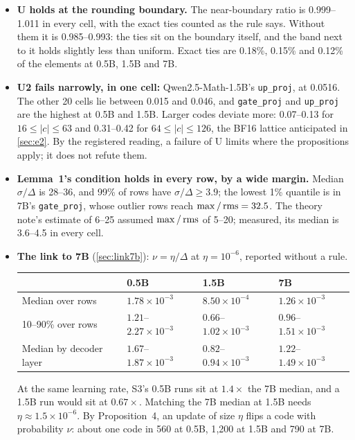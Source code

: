 \documentclass[11pt]{article}
\begin{document}
\begin{itemize}
\item \textbf{U holds at the rounding boundary.} The near-boundary ratio is 0.999--1.011 in every cell, with the exact ties counted as the rule says. Without them it is 0.985--0.993: the ties sit on the boundary itself, and the band next to it holds slightly less than uniform. Exact ties are 0.18\%, 0.15\% and 0.12\% of the elements at 0.5B, 1.5B and 7B.
\item \textbf{U2 fails narrowly, in one cell:} Qwen2.5-Math-1.5B's \texttt{up\_proj}, at 0.0516. The other 20 cells lie between 0.015 and 0.046, and \texttt{gate\_proj} and \texttt{up\_proj} are the highest at 0.5B and 1.5B. Larger codes deviate more: 0.07--0.13 for $16\le|c|\le63$ and 0.31--0.42 for $64\le|c|\le126$, the BF16 lattice anticipated in \cref{sec:e2}. By the registered reading, a failure of U limits where the propositions apply; it does not refute them.
\item \textbf{Lemma~1's condition holds in every row, by a wide margin.} Median $\sigma/\Delta$ is 28--36, and 99\% of rows have $\sigma/\Delta\ge3.9$; the lowest 1\% quantile is in 7B's \texttt{gate\_proj}, whose outlier rows reach $\max/\operatorname{rms}=32.5$. The theory note's estimate of 6--25 assumed $\max/\operatorname{rms}$ of 5--20; measured, its median is 3.6--4.5 in every cell.
\item \textbf{The link to 7B} (\cref{sec:link7b}): $\nu=\eta/\Delta$ at $\eta=10^{-6}$, reported without a rule.
\begin{center}\small
\begin{tabular}{@{}llll@{}}
\toprule
& 0.5B & 1.5B & 7B\\
\midrule
Median over rows & $1.78\times10^{-3}$ & $8.50\times10^{-4}$ & $1.26\times10^{-3}$\\
10--90\% over rows & $1.21$--$2.27\times10^{-3}$ & $0.66$--$1.02\times10^{-3}$ & $0.96$--$1.51\times10^{-3}$\\
Median by decoder layer & $1.67$--$1.87\times10^{-3}$ & $0.82$--$0.94\times10^{-3}$ & $1.22$--$1.49\times10^{-3}$\\
\bottomrule
\end{tabular}
\end{center}
At the same learning rate, S3's 0.5B runs sit at $1.4\times$ the 7B median, and a 1.5B run would sit at $0.67\times$. Matching the 7B median at 1.5B needs $\eta\approx1.5\times10^{-6}$. By Proposition~4, an update of size $\eta$ flips a code with probability $\nu$: about one code in 560 at 0.5B, 1{,}200 at 1.5B and 790 at 7B.
\end{itemize}
\end{document}
